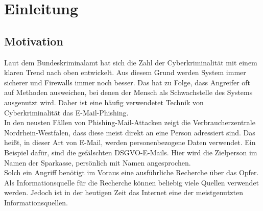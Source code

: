 \chapter{Einleitung}
\label{cha:einleitung}


\section{Motivation}
\label {sec:Motivation}
Laut dem Bundeskriminalamt hat sich die Zahl der Cyberkriminalität mit einem klaren Trend nach oben entwickelt. \cite{Cyberkriminalitaet} Aus diesem Grund werden System immer sicherer und Firewalls immer noch besser. Das hat zu Folge, dass Angreifer oft auf Methoden ausweichen, bei denen der Mensch als Schwachstelle des Systems ausgenutzt wird. Daher ist eine häufig verwendetet Technik von Cyberkriminalität das E-Mail-Phishing.\\
In den neusten Fällen von Phishing-Mail-Attacken zeigt die Verbraucherzentrale Nordrhein-Westfalen, dass diese meist direkt an eine Person adressiert sind. Das heißt, in dieser Art von E-Mail, werden personenbezogene Daten verwendet. Ein Beispiel dafür, sind die gefälschten DSGVO-E-Mails. Hier wird die Zielperson im Namen der Sparkasse, persönlich mit Namen angesprochen. \cite{VerbraucherzentraleNW} \\
Solch ein Angriff benötigt im Voraus eine ausführliche Recherche über das Opfer. Als Informationsquelle für die Recherche können beliebig viele Quellen verwendet werden. Jedoch ist in der heutigen Zeit das Internet eine der meistgenutzten Informationsquellen.\cite{Inforamtionsquellen}\\

